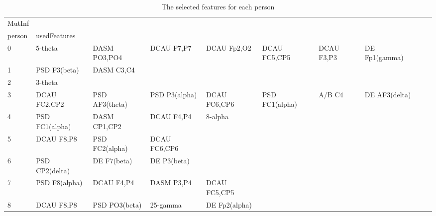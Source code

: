 \clearpage
\begin{landscape}
\begin{table}[]
\centering
\caption{The selected features for each person}
\begin{tabular}{l|llllllll}
MutInf   &                &                &                &                &                &                &                &                &               &              \\
person   & usedFeatures   &                &                &                &                &                &                &                &               &              \\
0        & 5-theta        & DASM PO3,PO4   & DCAU F7,P7     & DCAU Fp2,O2    & DCAU FC5,CP5   & DCAU F3,P3     & DE Fp1(gamma)  &                &               &              \\
1        & PSD F3(beta)   & DASM C3,C4     &                &                &                &                &                &                &               &              \\
2        & 3-theta        &                &                &                &                &                &                &                &               &              \\
3        & DCAU FC2,CP2   & PSD AF3(theta) & PSD P3(alpha)  & DCAU FC6,CP6   & PSD FC1(alpha) & A/B C4         & DE AF3(delta)  &                &               &              \\
4        & PSD FC1(alpha) & DASM CP1,CP2   & DCAU F4,P4     & 8-alpha        &                &                &                &                &               &              \\
5        & DCAU F8,P8     & PSD FC2(alpha) & DCAU FC6,CP6   &                &                &                &                &                &               &              \\
6        & PSD CP2(delta) & DE F7(beta)    & DE P3(beta)    &                &                &                &                &                &               &              \\
7        & PSD F8(alpha)  & DCAU F4,P4     & DASM P3,P4     & DCAU FC5,CP5   &                &                &                &                &               &              \\
8        & DCAU F8,P8     & PSD PO3(beta)  & 25-gamma       & DE Fp2(alpha)  &                &                &                &                &               &              \\

\end{tabular}
\end{table}
\end{landscape}
